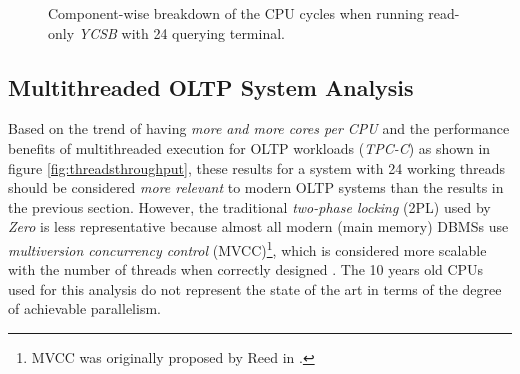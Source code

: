\begin{@empty}
\begin{figure}[h!]
        \caption[CPU cycles breakdown for multithreaded read-only YCSB]{Component-wise breakdown of the CPU cycles when running read-only \textit{YCSB} with 24 querying terminal.}
        \label{fig:cyclesycsbread24}
    \end{figure}
\end{@empty}

\subsection{Multithreaded OLTP System Analysis} \label{subsec:looking_glass_multi_threaded}

    Based on the trend of having \emph{more and more cores per CPU} and the performance benefits of multithreaded execution for OLTP workloads (\textit{TPC-C}) as shown in figure \ref{fig:threadsthroughput}, these results for a system with 24 working threads should be considered \emph{more relevant} to modern OLTP systems than the results in the previous section. However, the traditional \emph{two-phase locking} (2PL) used by \textit{Zero} is less representative because almost all modern (main memory) DBMSs use \emph{multiversion concurrency control} (MVCC)\footnote{MVCC was originally proposed by Reed in \cite{Reed:1978}.}, which is considered more scalable with the number of threads when correctly designed \cite{Wu:2017}. The 10 years old CPUs used for this analysis do not represent the state of the art in terms of the degree of achievable parallelism.

